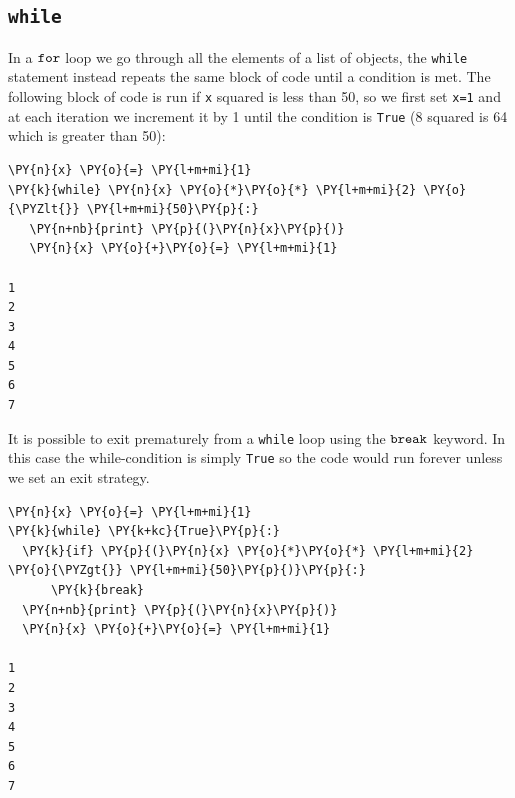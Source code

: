 \subsection{\texttt{while}}\label{while}

In a $\tt{for}$ loop we go through all the elements of a list of objects, the \texttt{while} statement instead repeats the same block of code until a condition is met.
The following block of code is run if \texttt{x} squared is less than 50, so we first set \texttt{x=1} and at each iteration we increment it by 1 until the condition is \texttt{True} (8 squared is 64 which is greater than 50):

\begin{tcolorbox}[breakable, size=fbox, boxrule=1pt, pad at break*=1mm, colback=cellbackground, colframe=cellborder]            
\begin{Verbatim}[commandchars=\\\{\}]
\PY{n}{x} \PY{o}{=} \PY{l+m+mi}{1}
\PY{k}{while} \PY{n}{x} \PY{o}{*}\PY{o}{*} \PY{l+m+mi}{2} \PY{o}{\PYZlt{}} \PY{l+m+mi}{50}\PY{p}{:}
   \PY{n+nb}{print} \PY{p}{(}\PY{n}{x}\PY{p}{)}
   \PY{n}{x} \PY{o}{+}\PY{o}{=} \PY{l+m+mi}{1}

1
2
3
4
5
6
7
\end{Verbatim}
\end{tcolorbox}

It is possible to exit prematurely from a \texttt{while} loop using the $\tt{break}$ keyword. In this case the while-condition is simply \texttt{True} so the code would run forever unless we set an exit strategy.

\begin{tcolorbox}[breakable, size=fbox, boxrule=1pt, pad at break*=1mm, colback=cellbackground, colframe=cellborder]            
\begin{Verbatim}[commandchars=\\\{\}]
\PY{n}{x} \PY{o}{=} \PY{l+m+mi}{1}
\PY{k}{while} \PY{k+kc}{True}\PY{p}{:}
  \PY{k}{if} \PY{p}{(}\PY{n}{x} \PY{o}{*}\PY{o}{*} \PY{l+m+mi}{2} \PY{o}{\PYZgt{}} \PY{l+m+mi}{50}\PY{p}{)}\PY{p}{:} 
      \PY{k}{break}
  \PY{n+nb}{print} \PY{p}{(}\PY{n}{x}\PY{p}{)}
  \PY{n}{x} \PY{o}{+}\PY{o}{=} \PY{l+m+mi}{1} 

1
2
3
4
5
6
7
\end{Verbatim}
\end{tcolorbox}
